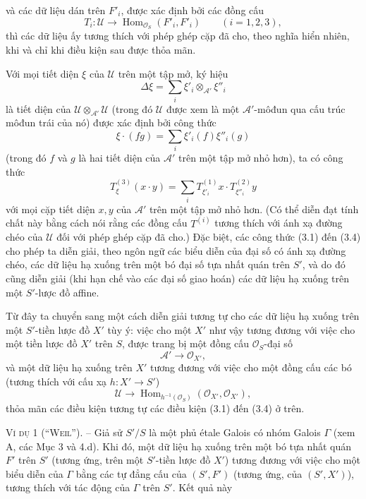 và các dữ liệu dán trên $F'_i$, được xác định bởi các đồng cấu
\[
  T_i:\mathcal U\longrightarrow
  \operatorname{Hom}_{\mathcal O_S}(F'_i,F'_i)
  \qquad (i=1,2,3),
\]
thì các dữ liệu ấy tương thích với phép ghép cặp đã cho, theo nghĩa hiển nhiên,
khi và chỉ khi điều kiện sau được thỏa mãn.

Với mọi tiết diện $\xi$ của $\mathcal U$ trên một tập mở, ký hiệu
\[
  \Delta\xi=\sum_i\xi'_i\otimes_{\mathcal A'}\xi''_i
\]
là tiết diện của $\mathcal U\otimes_{\mathcal A'}\mathcal U$ (trong đó
$\mathcal U$ được xem là một $\mathcal A'$-môđun qua cấu trúc môđun trái của
nó) được xác định bởi công thức
\[
  \xi\mathbin{\cdot}(fg)=\sum_i\xi'_i(f)\xi''_i(g)
\]
(trong đó $f$ và $g$ là hai tiết diện của $\mathcal A'$ trên một tập mở nhỏ
hơn), ta có công thức
\begin{equation}
  T^{(3)}_\xi(x\mathbin{\cdot}y)
  =\sum_iT^{(1)}_{\xi'_i}x\mathbin{\cdot}T^{(2)}_{\xi''_i}y
  \tag{3.4}
\end{equation}
với mọi cặp tiết diện $x,y$ của $\mathcal A'$ trên một tập mở nhỏ hơn. (Có
thể diễn đạt tính chất này bằng cách nói
rằng các đồng cấu $T^{(i)}$ tương thích với ánh xạ đường chéo của $\mathcal U$
đối với phép ghép cặp đã cho.) Đặc biệt, các công thức (3.1) đến (3.4) cho phép
ta diễn giải, theo ngôn ngữ các biểu diễn của đại số có ánh xạ đường chéo, các
dữ liệu hạ xuống trên một bó đại số tựa nhất quán trên $S'$, và do đó cũng diễn
giải (khi hạn chế vào các đại số giao hoán) các dữ liệu hạ xuống trên một
$S'$-lược đồ affine.

Từ đây ta chuyển sang một cách diễn giải tương tự cho các dữ liệu hạ xuống trên
một $S'$-tiền lược đồ $X'$ tùy ý: việc cho một $X'$ như vậy tương đương với
việc cho một tiền lược đồ $X'$ trên $S$, được trang bị một đồng cấu
$\mathcal O_S$-đại số
\[
  \mathcal A'\longrightarrow\mathcal O_{X'},
\]
và một dữ liệu hạ xuống trên $X'$ tương đương với việc cho một đồng cấu các bó
(tương thích với cấu xạ $h:X'\longrightarrow S'$)
\[
  \mathcal U\longrightarrow
  \operatorname{Hom}_{h^{-1}(\mathcal O_S)}
  (\mathcal O_{X'},\mathcal O_{X'}),
\]
thỏa mãn các điều kiện tương tự các điều kiện (3.1) đến (3.4) ở trên.

\textsc{Ví dụ 1 (``Weil'').} -- Giả sử $S'/S$ là một phủ étale Galois có nhóm
Galois $\Gamma$ (xem A, các Mục 3 và 4.d). Khi đó, một dữ liệu hạ xuống trên một
bó tựa nhất quán $F'$ trên $S'$ (tương ứng, trên một $S'$-tiền lược đồ $X'$)
tương đương với việc cho một biểu diễn của $\Gamma$ bằng các tự đẳng cấu của
$(S',F')$ (tương ứng, của $(S',X')$), tương thích với tác động của $\Gamma$
trên $S'$. Kết quả này

